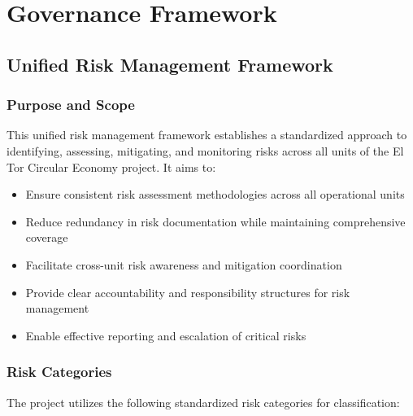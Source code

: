 \section{Governance Framework}

\subsection{Unified Risk Management Framework} \label{sec:unified_risk_management}

\subsubsection{Purpose and Scope}
This unified risk management framework establishes a standardized approach to identifying, assessing, mitigating, and monitoring risks across all units of the El Tor Circular Economy project. It aims to:

\begin{itemize}
    \item Ensure consistent risk assessment methodologies across all operational units
    \item Reduce redundancy in risk documentation while maintaining comprehensive coverage
    \item Facilitate cross-unit risk awareness and mitigation coordination
    \item Provide clear accountability and responsibility structures for risk management
    \item Enable effective reporting and escalation of critical risks
\end{itemize}

\subsubsection{Risk Categories} \label{sec:risk_categories}
The project utilizes the following standardized risk categories for classification:

